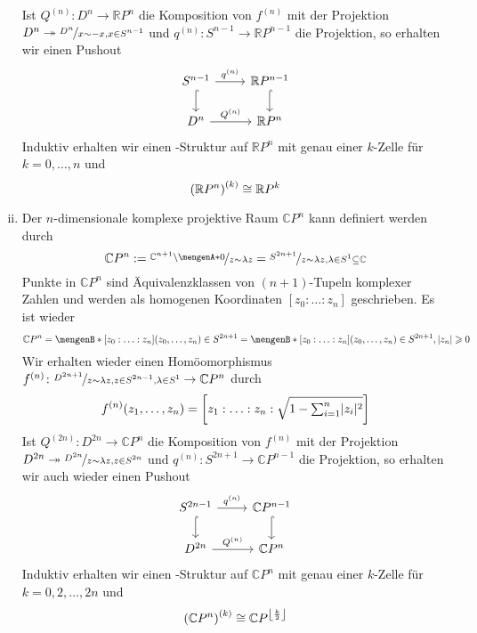 \begin{enumerate}[(i)]
\[	\]
	Ist $Q^{(n)} \colon D^n \to \mathds{R}P^n$ die Komposition von $f^{(n)}$ mit der Projektion $D^n \twoheadrightarrow \nicefrac{D^n}{x \sim -x, x \in S^{n-1}}$ und 
	$q^{(n)} \colon S^{n-1} \to \mathds{R}P^{n-1}$ die Projektion, so erhalten wir einen Pushout
	\[
		\begin{tikzcd}
			S^{n-1} \rar["q^{(n)}"] \dar[hook]& \mathds{R}P^{n-1} \dar[hook] \\
			D^n \rar["Q^{(n)}"] & \mathds{R}P^n
		\end{tikzcd}
	\]
	Induktiv erhalten wir einen \CW-Struktur auf $\mathds{R}P^n$ mit genau einer $k$-Zelle für $k=0,\ldots ,n$ und 
	\[
		\enbrace*{\mathds{R}P^n}^{(k)} \cong \mathds{R}P^k 
	\]
	\item Der $n$-dimensionale komplexe projektive Raum $\mathds{C}P^n$ kann definiert werden durch 
	\[
		\mathds{C}P^n := \nicefrac{\mathds{C}^{n+1} \setminus \set{0}}{z \sim \lambda z} = \nicefrac{S^{2n+1}}{z \sim \lambda z, \lambda \in S^1 \subseteq \mathds{C}}
	\]
	Punkte in $\mathds{C}P^n$ sind Äquivalenzklassen von $(n+1)$-Tupeln komplexer Zahlen und werden als homogenen Koordinaten $[z_0 : \ldots : z_n]$ 
	geschrieben. Es ist wieder
	\[
		\mathds{C}P^n = \set[{[z_0 : \ldots : z_n]}]{(z_0, \ldots ,z_n) \in S^{2n+1} \rule{0cm}{1em}} 
		= \set[{[z_0 : \ldots : z_n]}]{(z_0, \ldots ,z_n) \in S^{2n+1}, \abs{z_n} \ge 0 \rule{0cm}{1em}}
	\]
	Wir erhalten wieder einen Homöomorphismus $f^{(n)} \colon \nicefrac{D^{2n+1}}{z \sim \lambda z, z \in S^{2n-1},\lambda \in S^{1}} \to \mathds{C}P^n$ durch
	\[
		f^{(n)} \enbrace*{z_1, \ldots ,z_n} = \benbrace*{z_1 : \ldots : z_n : \sqrt{1- {\textstyle\sum\nolimits_{i=1}^{n}} \abs{z_i}^2}} 
	\]
	Ist $Q^{(2n)} \colon D^{2n} \to \mathds{C}P^n$ die Komposition von $f^{(n)}$ mit der Projektion $D^{2n} \twoheadrightarrow \nicefrac{D^{2n}}{z \sim \lambda z, z \in S^{2n}}$ und 
	$q^{(n)} \colon S^{2n+1} \to \mathds{C}P^{n-1}$ die Projektion, so erhalten wir auch wieder einen Pushout
	\[
		\begin{tikzcd}
			S^{2n-1} \rar["q^{(n)}"] \dar[hook]& \mathds{C}P^{n-1} \dar[hook] \\
			D^{2n} \rar["Q^{(n)}"] & \mathds{C}P^n
		\end{tikzcd}
	\]
	Induktiv erhalten wir einen \CW-Struktur auf $\mathds{C}P^n$ mit genau einer $k$-Zelle für $k=0,2,\ldots ,2n$ und 
	\[
		\enbrace*{\mathds{C}P^n}^{(k)} \cong \mathds{C}P^{\floor*{\frac{k}{2}}} 
	\]
\end{enumerate}

